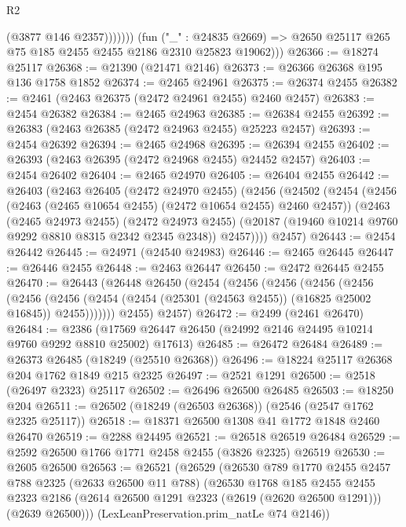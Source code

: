 \begin{lexlean}{R2}
\begin{coremodule}
                    (@3877 @146 @2357)))))))
        (fun ("_" : @24835 @2669) =>
        @2650 @25117 @265 @75 @185 @2455 @2455 @2186 @2310 @25823 @19062)))
@26366 := @18274 @25117
@26368 := @21390 (@21471 @2146)
@26373 := @26366 @26368 @195 @136 @1758 @1852
@26374 := @2465 @24961
@26375 := @26374 @2455
@26382 := @2461 (@2463 @26375 (@2472 @24961 @2455) @2460 @2457)
@26383 := @2454 @26382
@26384 := @2465 @24963
@26385 := @26384 @2455
@26392 := @26383 (@2463 @26385 (@2472 @24963 @2455) @25223 @2457)
@26393 := @2454 @26392
@26394 := @2465 @24968
@26395 := @26394 @2455
@26402 := @26393 (@2463 @26395 (@2472 @24968 @2455) @24452 @2457)
@26403 := @2454 @26402
@26404 := @2465 @24970
@26405 := @26404 @2455
@26442 := @26403
    (@2463
      @26405
      (@2472 @24970 @2455)
      (@2456
        (@24502
          (@2454
            (@2456 (@2463 (@2465 @10654 @2455) (@2472 @10654 @2455) @2460 @2457))
            (@2463
              (@2465 @24973 @2455)
              (@2472 @24973 @2455)
              (@20187 (@19460 @10214 @9760 @9292 @8810 @8315 @2342 @2345 @2348))
              @2457))))
      @2457)
@26443 := @2454 @26442
@26445 := @24971 (@24540 @24983)
@26446 := @2465 @26445
@26447 := @26446 @2455
@26448 := @2463 @26447
@26450 := @2472 @26445 @2455
@26470 := @26443
    (@26448
      @26450
      (@2454
        (@2456
          (@2456
            (@2456
              (@2456
                (@2456
                  (@2456 (@2454 (@2454 (@25301 (@24563 @2455)) (@16825 @25002 @16845)) @2455)))))))
        @2455)
      @2457)
@26472 := @2499 (@2461 @26470)
@26484 := @2386 (@17569 @26447 @26450 (@24992 @2146 @24495 @10214 @9760 @9292 @8810 @25002) @17613)
@26485 := @26472 @26484
@26489 := @26373 @26485 (@18249 (@25510 @26368))
@26496 := @18224 @25117 @26368 @204 @1762 @1849 @215 @2325
@26497 := @2521 @1291
@26500 := @2518 (@26497 @2323) @25117
@26502 := @26496 @26500 @26485
@26503 := @18250 @204
@26511 := @26502 (@18249 (@26503 @26368)) (@2546 (@2547 @1762 @2325 @25117))
@26518 := @18371 @26500 @1308 @41 @1772 @1848 @2460 @26470
@26519 := @2288 @24495
@26521 := @26518 @26519 @26484
@26529 := @2592 @26500 @1766 @1771 @2458 @2455 (@3826 @2325) @26519
@26530 := @2605 @26500
@26563 := @26521
    (@26529
      (@26530
        @789
        @1770
        @2455
        @2457
        @788
        @2325
        (@2633 @26500 @11 @788)
        (@26530
          @1768
          @185
          @2455
          @2455
          @2323
          @2186
          (@2614 @26500 @1291 @2323 (@2619 (@2620 @26500 @1291)))
          (@2639 @26500)))
      (LexLeanPreservation.prim_natLe @74 @2146))

\end{coremodule}
\end{lexlean}
